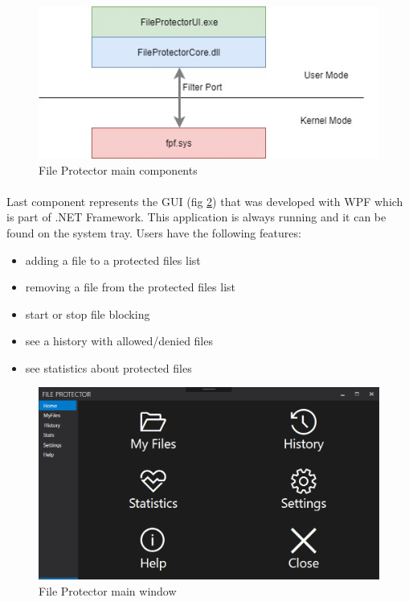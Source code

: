 		\begin{figure}[h!]
			\begin{center}
				\includegraphics{images/fpMainComponents.jpg}
				\caption{File Protector main components}
				\label{fig:FPMAinComponents}
			\end{center}
		\end{figure}
		
		
		\paragraph{}
		Last component represents the GUI (fig \ref{fig:FPMainWindow}) that was developed with WPF which is part of .NET Framework. This application is always running and it can be found on the system tray. Users have the following features:
		
		\begin{itemize}
			\item adding a file to a protected files list
			\item removing a file from the protected files list
			\item start or stop file blocking
			\item see a history with allowed/denied files
			\item see statistics about protected files
		\end{itemize}
		
		\begin{figure}[h!]
			\begin{center}
				\includegraphics[scale=0.7]{images/FileProtectorMainInterface.PNG}
				\caption{File Protector main window}
				\label{fig:FPMainWindow}
			\end{center}
		\end{figure}
	
